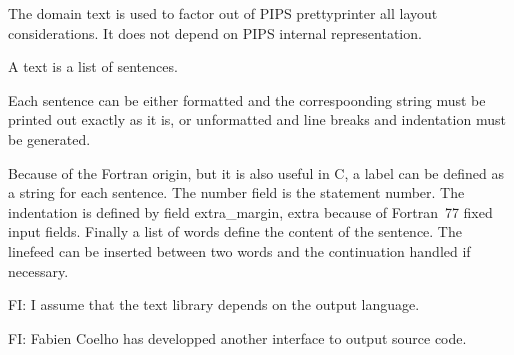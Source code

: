 \documentclass{article}
\begin{document}
\sloppy

The domain text is used to factor out of PIPS prettyprinter all layout
considerations. It does not depend on PIPS internal representation.

{}

A text is a list of sentences.

{}

Each sentence can be either formatted and the correspoonding string
must be printed out exactly as it is, or unformatted and line breaks
and indentation must be generated.

{}

Because of the Fortran origin, but it is also useful in C, a label can
be defined as a string for each sentence. The number field is the
statement number. The indentation is defined by field extra\_margin,
extra because of Fortran~77 fixed input fields. Finally a list of
words define the content of the sentence. The linefeed can be inserted
between two words and the continuation handled if necessary.

FI: I assume that the text library depends on the output language.

FI: Fabien Coelho has developped another interface to output source code.
\end{document}
